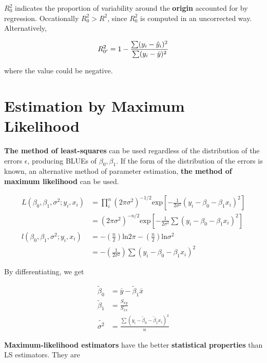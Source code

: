 \documentclass[12pt]{article}
\begin{document}
$R_0^2$ indicates the proportion of variability around the \textbf{origin} accounted for by regression. Occationally $R_0^2 > R^2$, since $R_0^2$ is computed in an uncorrected way. Alternatively,

$$
R_{0'}^2 = 1 - \frac{\sum (y_i - \hat{y}_i)^2 }{\sum (y_i - \bar{y})^2 } \\[8pt]
$$

where the value could be negative. 

\pagebreak
\section{Estimation by Maximum Likelihood}

\textbf{The method of least-squares} can be used regardless of the distribution of the errors $\epsilon$, producing BLUEs of $\beta_0, \beta_1$. If the form of the distribution of the errors is known, an alternative method of parameter estimation, \textbf{the method of maximum likelihood} can be used. 


$$
\begin{aligned}
	L(\beta_0, \beta_1, \sigma^2; y_i, x_i) &= \prod_i^n (2\pi \sigma^2)^{-1/2} \mathrm{exp} \left[ - \frac{1}{2 \sigma^2} (y_i - \beta_0 - \beta_1 x_i)^2 \right] \\[8pt]
	&= (2\pi \sigma^2)^{-n/2} \mathrm{exp} \left[ - \frac{1}{2 \sigma^2} \sum (y_i - \beta_0 - \beta_1 x_i)^2 \right] \\[10pt]
	l(\beta_0, \beta_1, \sigma^2; y_i, x_i) &= - (\frac{n}{2}) \mathrm{ln}2 \pi - (\frac{n}{2}) \mathrm{ln}\sigma^2 \\[8pt]
	&= - (\frac{1}{2\sigma^2}) \sum (y_i -\beta_0 - \beta_1 x_i)^2
\end{aligned}
$$


By differentiating, we get

$$
\begin{aligned}
\tilde{\beta}_0 &= \bar{y} - \tilde{\beta}_1 \bar{x}  \\[8pt]
\tilde{\beta}_1 &= \frac{S_{xy}}{S_{xx}} \\[10pt]
\tilde{\sigma^2} &= \frac{\sum (y_i - \tilde{\beta}_0 - \tilde{\beta}_1 x_i )^2 }{n}
\end{aligned}
$$

\textbf{Maximum-likelihood estimators} have the better \textbf{statistical properties} than LS estimators. They are
\end{document}
